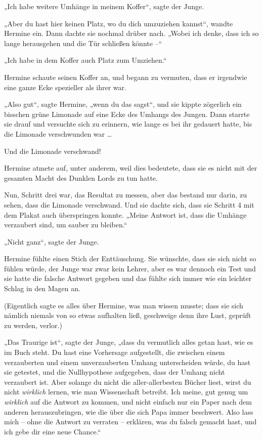 „Ich habe weitere Umhänge in meinem Koffer“, sagte der Junge. 

„Aber du hast hier keinen Platz, wo du dich umzuziehen kannst“, wandte Hermine ein. Dann dachte sie nochmal drüber nach. „Wobei ich denke, dass ich so lange herausgehen und die Tür schließen könnte –“ 

„Ich habe in dem Koffer auch Platz zum Umziehen.“ 

Hermine schaute seinen Koffer an, und begann zu vermuten, dass er irgendwie eine ganze Ecke spezieller als ihrer war. 

„Also gut“, sagte Hermine, „wenn du das sagst“, und sie kippte zögerlich ein bisschen grüne Limonade auf eine Ecke des Umhangs des Jungen. Dann starrte sie drauf und versuchte sich zu erinnern, wie lange es bei ihr gedauert hatte, bis die Limonade verschwunden war … 

Und die Limonade verschwand! 

Hermine atmete auf, unter anderem, weil dies bedeutete, dass sie es nicht mit der gesamten Macht des Dunklen Lords zu tun hatte. 

Nun, Schritt drei war, das Resultat zu messen, aber das bestand nur darin, zu sehen, dass die Limonade verschwand. Und sie dachte sich, dass sie Schritt 4 mit dem Plakat auch überspringen konnte. „Meine Antwort ist, dass die Umhänge verzaubert sind, um sauber zu bleiben.“ 

„Nicht ganz“, sagte der Junge. 

Hermine fühlte einen Stich der Enttäuschung. Sie wünschte, dass sie sich nicht so fühlen würde, der Junge war zwar kein Lehrer, aber es war dennoch ein Test und sie hatte die falsche Antwort gegeben und das fühlte sich immer wie ein leichter Schlag in den Magen an. 

(Eigentlich sagte es alles über Hermine, was man wissen musste; dass sie sich nämlich niemals von so etwas aufhalten ließ, geschweige denn ihre Lust, geprüft zu werden, verlor.) 

„Das Traurige ist“, sagte der Junge, „dass du vermutlich alles getan hast, wie es im Buch steht. Du hast eine Vorhersage aufgestellt, die zwischen einem verzauberten und einem unverzauberten Umhang unterscheiden würde, du hast sie getestet, und die Nullhypothese aufgegeben, dass der Umhang nicht verzaubert ist. Aber solange du nicht die aller-allerbesten Bücher liest, wirst du nicht \emph{wirklich} lernen, wie man Wissenschaft betreibt. Ich meine, gut genug um \emph{wirklich} auf die Antwort zu kommen, und nicht einfach nur ein Paper nach dem anderen herauszubringen, wie die über die sich Papa immer beschwert. Also lass mich – ohne die Antwort zu verraten – erklären, was du falsch gemacht hast, und ich gebe dir eine neue Chance.“ 

